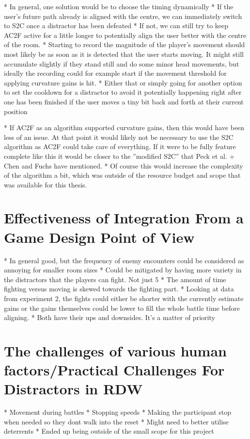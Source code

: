 * In general, one solution would be to choose the timing dynamically
   * If the user's future path already is aligned with the centre, we can immediately switch to S2C once a distractor has been defeated
   * If not, we can still try to keep AC2F active for a little longer to potentially align the user better with the centre of the room. 
   * Starting to record the magnitude of the player's movement should most likely be as soon as it is detected that the user starts moving. It might still accumulate slightly if they stand still and do some minor head movements, but ideally the recording could for example start if the movement threshold for applying curvature gains is hit. 
      * Either that or simply going for another option to set the cooldown for a distractor to avoid it potentially happening right after one has been finished if the user moves a tiny bit back and forth at their current position
    
* If AC2F as an algorithm supported curvature gains, then this would have been less of an issue. At that point it would likely not be necessary to use the S2C algorithm as AC2F could take care of everything. If it were to be fully feature complete like this it would be closer to the ''modified S2C'' that Peck et al. + Chen and Fuchs have mentioned. 
   * Of course this would increase the complexity of the algorithm a bit, which was outside of the resource budget and scope that was available for this thesis. 

\section{Effectiveness of Integration From a Game Design Point of View}

* In general good, but the frequency of enemy encounters could be considered as annoying for smaller room sizes
   * Could be mitigated by having more variety in the distractors that the players can fight. Not just 5
   * The amount of time fighting versus moving is skewed towards the fighting part.
   * Looking at data from experiment 2, the fights could either be shorter with the currently estimate gains or the gains themselves could be lower to fill the whole battle time before aligning. 
      * Both have their ups and downsides. It's a matter of priority

\section{The challenges of various human factors/Practical Challenges For Distractors in RDW}
* Movement during battles
* Stopping speeds
     * Making the participant stop when needed so they dont walk into the reset
        * Might need to better utilise deterrents
            * Ended up being outside of the small scope for this project